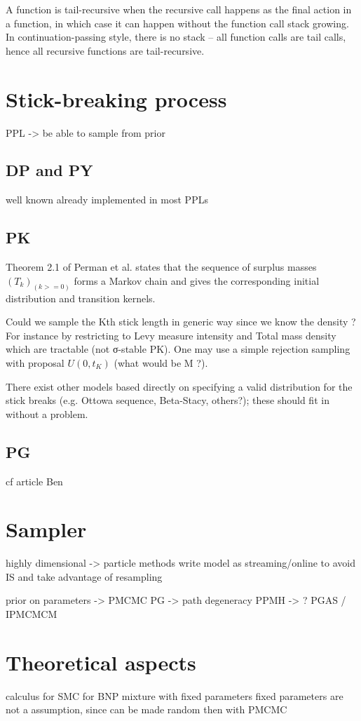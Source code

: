 A function is tail-recursive when the recursive call happens as the final action in a function, in which case it can happen without the function call stack growing. In continuation-passing style, there is no stack – all function calls are tail calls, hence all recursive functions are tail-recursive.

\section{Stick-breaking process}
PPL -> be able to sample from prior

\subsection{DP and PY}
well known
already implemented in most \gls{PPL}s

\subsection{PK}
Theorem 2.1 of Perman et al. states that the sequence of surplus masses $(T_k)_(k>=0)$ forms a Markov chain and gives the corresponding initial distribution and transition kernels.

Could we sample the Kth stick length in generic way since we know the density ? For instance by restricting to Levy measure intensity and Total mass density which are tractable (not σ-stable PK). One may use a simple rejection sampling with proposal $U(0, t_K)$ (what would be M ?).

There exist other models based directly on specifying a valid distribution for the stick breaks (e.g. Ottowa sequence, Beta-Stacy, others?); these should fit in without a problem.

\subsection{PG}
cf article Ben

\section{Sampler}

highly dimensional -> particle methods
write model as streaming/online to avoid IS and take advantage of resampling

prior on parameters -> PMCMC
PG -> path degeneracy
PPMH -> ?
PGAS / IPMCMCM

\section{Theoretical aspects}
calculus for SMC for BNP mixture with fixed parameters
fixed parameters are not a assumption, since can be made random then with PMCMC

